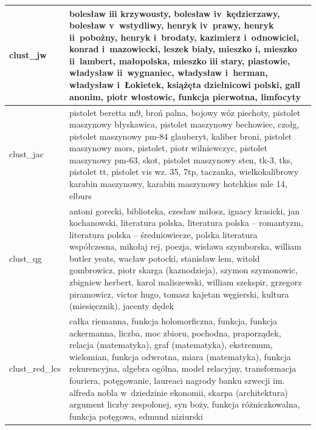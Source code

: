 \documentclass{praca1}
\begin{document}
\begin{longtable}{|L{0.5cm}|L{15cm}|}
   \hline
\begin{sideways}clust\_jw\end{sideways} & bolesław iii krzywousty, bolesław iv~kędzierzawy, bolesław v~wstydliwy, henryk iv~prawy, henryk ii~pobożny, henryk i~brodaty, kazimierz i~odnowiciel, konrad i~mazowiecki, leszek biały, mieszko i, mieszko ii~lambert, małopolska, mieszko iii stary, piastowie, władysław ii~wygnaniec, władysław i~herman, władysław i~Łokietek, książęta dzielnicowi polski, gall anonim, piotr włostowic, funkcja pierwotna, limfocyty \\ %
   \hline
\begin{sideways}clust\_jac\end{sideways} & pistolet beretta m9, broń palna, bojowy wóz piechoty, pistolet maszynowy błyskawica, pistolet maszynowy bechowiec, czołg, pistolet maszynowy pm-84 glauberyt, kaliber broni, pistolet maszynowy mors, pistolet, piotr wilniewczyc, pistolet maszynowy pm-63, skot, pistolet maszynowy sten, tk-3, tks, pistolet tt, pistolet vis wz. 35, 7tp, taczanka, wielkokalibrowy karabin maszynowy, karabin maszynowy hotchkiss mle 14, elburs \\ %
   \hline
\begin{sideways}clust\_qg\end{sideways} & antoni gorecki, biblioteka, czesław miłosz, ignacy krasicki, jan kochanowski, literatura polska, literatura polska – romantyzm, literatura polska – średniowiecze, polska literatura współczesna, mikołaj rej, poezja, wisława szymborska, william butler yeats, wacław potocki, stanisław lem, witold gombrowicz, piotr skarga (kaznodzieja), szymon szymonowic, zbigniew herbert, karol maliszewski, william szekspir, grzegorz piramowicz, victor hugo, tomasz kajetan węgierski, kultura (miesięcznik), jacenty dędek \\ %
   \hline
\begin{sideways}clust\_red\_lcs\end{sideways} & całka riemanna, funkcja holomorficzna, funkcja, funkcja ackermanna, liczba, moc zbioru, pochodna, praporządek, relacja (matematyka), graf (matematyka), ekstremum, wielomian, funkcja odwrotna, miara (matematyka), funkcja rekurencyjna, algebra ogólna, model relacyjny, transformacja fouriera, potęgowanie, laureaci nagrody banku szwecji im. alfreda nobla w~dziedzinie ekonomii, skarpa (architektura) argument liczby zespolonej, syn boży, funkcja różniczkowalna, funkcja potęgowa, edmund niziurski \\ %

\end{longtable}
\end{document}
